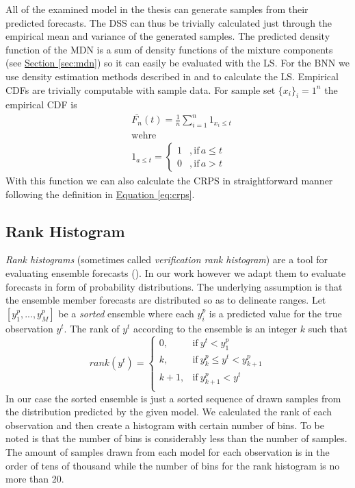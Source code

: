 \documentclass[12pt,a4paper,twoside]{scrartcl}
\numberwithin{equation}{section}
\newcommand{\refsec}[1]{\hyperref[#1]{Section \ref*{#1}}}
\renewcommand*{\refeq}[1]{\hyperref[#1]{Equation \ref*{#1}}}
\begin{document}
All of the examined model in the thesis can generate samples from their predicted forecasts. The DSS can thus be trivially calculated just through the empirical mean and variance of the generated samples. The predicted density function of the MDN is a sum of density functions of the mixture components (see \refsec{sec:mdn}) so it can easily be evaluated with the LS. For the BNN we use density estimation methods described in \cite{silverman1986} and \cite{scott2015} to calculate the LS. Empirical CDFs are trivially computable with sample data. For sample set \(\{x_i\}_i=1^n\) the empirical CDF is
\begin{align}
  &\bar{F_n}(t)=\frac{1}{n}\sum_{i=1}^n1_{x_i\leq t} \\
  &\text{wehre} \\
  &1_{a\leq t} =
        \begin{cases}
          1 &,\text{if}\, a \leq t \\
          0 &,\text{if}\, a > t 
        \end{cases}
\end{align}
With this function we can also calculate the CRPS in straightforward manner following the definition in \refeq{eq:crps}.
\subsection{Rank Histogram}
\label{sec:rank-hist}

\emph{Rank histograms} (sometimes called \emph{verification rank histogram}) are a tool for evaluating ensemble forecasts (\cite{hamill2001}). In our work however we adapt them to evaluate forecasts in form of probability distributions. The underlying assumption is that the ensemble member forecasts are distributed so as to delineate ranges. Let \([y_1^p,..., y_M^p]\) be a \emph{sorted} ensemble where each \(y_i^p\) is a predicted value for the true observation \(y^t\). The rank of \(y^t\) according to the ensemble is an integer \(k\) such that
\begin{equation}  
  rank(y^t)=
  \begin{cases}
    0,   & \text{if}\  y^t < y_1^p \\
    k,   & \text{if}\  y_{k}^p \leq y^t < y_{k+1}^p  \\
    k+1, & \text{if}\  y_{k+1}^p <  y^t  \\
  \end{cases}
\end{equation}
In our case the sorted ensemble is just a sorted sequence of drawn samples from the distribution predicted by the given model. We calculated the rank of each observation and then create a histogram with certain number of bins. To be noted is that the number of bins is considerably less than the number of samples. The amount of samples drawn from each model for each observation is in the order of tens of thousand while the number of bins for the rank histogram is no more than 20.
\end{document}
